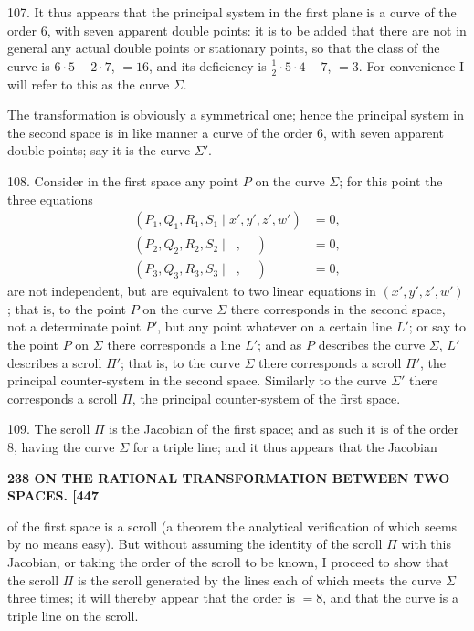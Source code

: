 \documentclass[11pt]{article}
\begin{document}
107. It thus appears that the principal system in the first plane is a curve of
the order 6, with seven apparent double points: it is to be added that there are
not in general any actual double points or stationary points, so that the class of the
curve is $6\cdot5 - 2\cdot7$, $=16$, and its deficiency is $\tfrac{1}{2}\cdot 5\cdot 4 - 7$, $=3$. For convenience I will
refer to this as the curve $\Sigma$.

The transformation is obviously a symmetrical one; hence the principal system in
the second space is in like manner a curve of the order 6, with seven apparent
double points; say it is the curve $\Sigma'$.

\medskip

108. Consider in the first space any point $P$ on the curve $\Sigma$; for this point the
three equations
\begin{align*}
(P_1, Q_1, R_1, S_1 \mid x', y', z', w') &= 0,\\
(P_2, Q_2, R_2, S_2 \mid \;\;,\;\;\;\;) &= 0,\\
(P_3, Q_3, R_3, S_3 \mid \;\;,\;\;\;\;) &= 0,
\end{align*}
are not independent, but are equivalent to two linear equations in $(x', y', z', w')$;
that is, to the point $P$ on the curve $\Sigma$ there corresponds in the second space, not
a determinate point $P'$, but any point whatever on a certain line $L'$; or say to the
point $P$ on $\Sigma$ there corresponds a line $L'$; and as $P$ describes the curve $\Sigma$,
$L'$ describes a scroll $\Pi'$; that is, to the curve $\Sigma$ there corresponds a scroll $\Pi'$, the
principal counter-system in the second space. Similarly to the curve $\Sigma'$ there corresponds
a scroll $\Pi$, the principal counter-system of the first space.

\medskip

109. The scroll $\Pi$ is the Jacobian of the first space; and as such it is of the
order 8, having the curve $\Sigma$ for a triple line; and it thus appears that the Jacobian

\medskip
\noindent\textbf{238 \hfill ON THE RATIONAL TRANSFORMATION BETWEEN TWO SPACES. \hfill [447}

\medskip

of the first space is a scroll (a theorem the analytical verification of which seems by
no means easy). But without assuming the identity of the scroll $\Pi$ with this Jacobian,
or taking the order of the scroll to be known, I proceed to show that the scroll $\Pi$
is the scroll generated by the lines each of which meets the curve $\Sigma$ three times;
it will thereby appear that the order is $=8$, and that the curve is a triple line on
the scroll.
\end{document}
